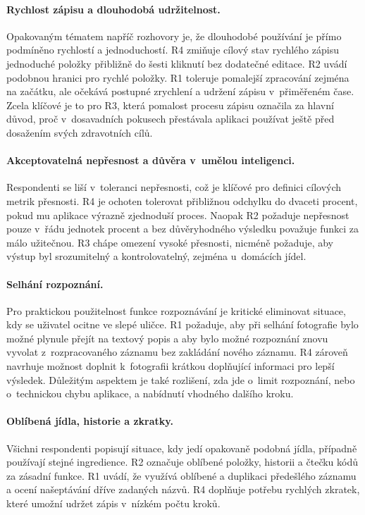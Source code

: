\paragraph{Rychlost zápisu a dlouhodobá udržitelnost.}
Opakovaným tématem napříč rozhovory je, že dlouhodobé používání je přímo podmíněno rychlostí a jednoduchostí.
R4 zmiňuje cílový stav rychlého zápisu jednoduché položky přibližně do šesti kliknutí bez dodatečné editace.
R2 uvádí podobnou hranici pro rychlé položky.
R1 toleruje pomalejší zpracování zejména na začátku, ale očekává postupné zrychlení a udržení zápisu v~přiměřeném čase.
Zcela klíčové je to pro R3, která pomalost procesu zápisu označila za hlavní důvod, proč v~dosavadních pokusech přestávala aplikaci používat ještě před dosažením svých zdravotních cílů.

\paragraph{Akceptovatelná nepřesnost a důvěra v~umělou inteligenci.}
Respondenti se liší v~toleranci nepřesnosti, což je klíčové pro definici cílových metrik přesnosti.
R4 je ochoten tolerovat přibližnou odchylku do dvaceti procent, pokud mu aplikace výrazně zjednoduší proces.
Naopak R2 požaduje nepřesnost pouze v~řádu jednotek procent a bez důvěryhodného výsledku považuje funkci za málo užitečnou.
R3 chápe omezení vysoké přesnosti, nicméně požaduje, aby výstup byl srozumitelný a kontrolovatelný, zejména u~domácích jídel.

\paragraph{Selhání rozpoznání.}
Pro praktickou použitelnost funkce rozpoznávání je kritické eliminovat situace, kdy se uživatel ocitne ve slepé uličce.
R1 požaduje, aby při selhání fotografie bylo možné plynule přejít na textový popis a aby bylo možné rozpoznání znovu vyvolat z~rozpracovaného záznamu bez zakládání nového záznamu.
R4 zároveň navrhuje možnost doplnit k~fotografii krátkou doplňující informaci pro lepší výsledek.
Důležitým aspektem je také rozlišení, zda jde o~limit rozpoznání, nebo o~technickou chybu aplikace, a nabídnutí vhodného dalšího kroku.

\paragraph{Oblíbená jídla, historie a zkratky.}
Všichni respondenti popisují situace, kdy jedí opakovaně podobná jídla, případně používají stejné ingredience.
R2 označuje oblíbené položky, historii a čtečku kódů za zásadní funkce.
R1 uvádí, že využívá oblíbené a duplikaci předešlého záznamu a ocení našeptávání dříve zadaných názvů.
R4 doplňuje potřebu rychlých zkratek, které umožní udržet zápis v~nízkém počtu kroků.

